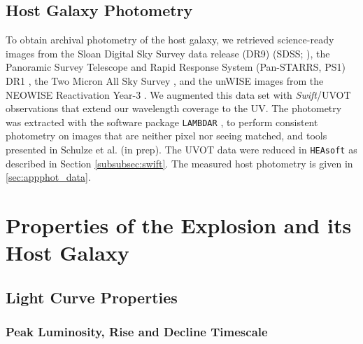 \documentclass[twocolumn]{aastex63}
\newcommand{\swift}{\textit{Swift}}
\begin{document}
\begin{CJK*}{UTF8}{gbsn}
\subsection{Host Galaxy Photometry}
To obtain archival photometry of the host galaxy, we retrieved science-ready images from the Sloan 
Digital Sky Survey data release (DR9) (SDSS; \citealt{Ahn2012a}), the Panoramic Survey Telescope and 
Rapid Response System (Pan-STARRS, PS1) 
DR1 \citep{Flewelling2016a}, the Two Micron All Sky Survey \citep[2MASS;][]{Skrutskie2006a}, and the 
unWISE images \citep{Lang2014a} from the NEOWISE Reactivation Year-3 \citep{Meisner2017a}. We 
augmented this data set with \swift/UVOT observations that extend our wavelength coverage to 
the UV. The photometry was extracted with the software package \texttt{LAMBDAR} \citep[Lambda 
Adaptive Multi-Band Deblending Algorithm in R;][]{Wright2016a}, to perform consistent photometry on 
images 
that are neither pixel nor seeing matched, and tools presented in Schulze et al. (in prep). The UVOT 
data were reduced in \texttt{HEAsoft} as described in Section \ref{subsubsec:swift}. The 
measured host photometry is given in \ref{sec:appphot_data}. 

\section{Properties of the Explosion and its Host Galaxy} \label{sec:properties}
\subsection{Light Curve Properties}\label{subsec:lc_properties}

\subsubsection{Peak Luminosity, Rise and Decline Timescale}\label{subsubsec:compare_mag}


\end{CJK*}
\end{document}
